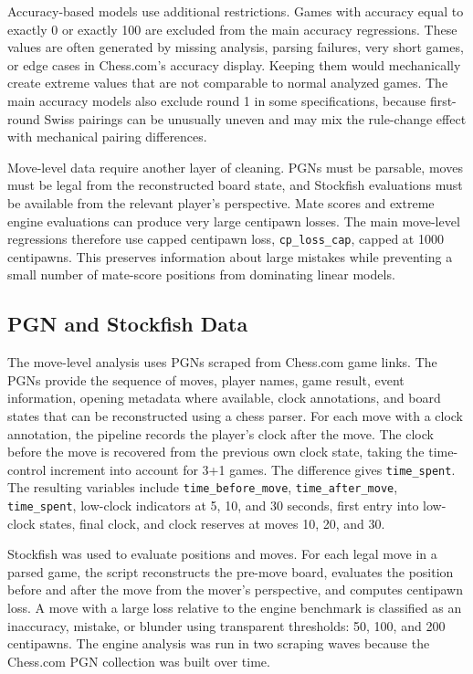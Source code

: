 Accuracy-based models use additional restrictions. Games with accuracy equal to exactly 0 or exactly 100 are excluded from the main accuracy regressions. These values are often generated by missing analysis, parsing failures, very short games, or edge cases in Chess.com's accuracy display. Keeping them would mechanically create extreme values that are not comparable to normal analyzed games. The main accuracy models also exclude round 1 in some specifications, because first-round Swiss pairings can be unusually uneven and may mix the rule-change effect with mechanical pairing differences.

Move-level data require another layer of cleaning. PGNs must be parsable, moves must be legal from the reconstructed board state, and Stockfish evaluations must be available from the relevant player's perspective. Mate scores and extreme engine evaluations can produce very large centipawn losses. The main move-level regressions therefore use capped centipawn loss, \texttt{cp\_loss\_cap}, capped at 1000 centipawns. This preserves information about large mistakes while preventing a small number of mate-score positions from dominating linear models.

\subsection{PGN and Stockfish Data}

The move-level analysis uses PGNs scraped from Chess.com game links. The PGNs provide the sequence of moves, player names, game result, event information, opening metadata where available, clock annotations, and board states that can be reconstructed using a chess parser. For each move with a clock annotation, the pipeline records the player's clock after the move. The clock before the move is recovered from the previous own clock state, taking the time-control increment into account for 3+1 games. The difference gives \texttt{time\_spent}. The resulting variables include \texttt{time\_before\_move}, \texttt{time\_after\_move}, \texttt{time\_spent}, low-clock indicators at 5, 10, and 30 seconds, first entry into low-clock states, final clock, and clock reserves at moves 10, 20, and 30.

Stockfish was used to evaluate positions and moves. For each legal move in a parsed game, the script reconstructs the pre-move board, evaluates the position before and after the move from the mover's perspective, and computes centipawn loss. A move with a large loss relative to the engine benchmark is classified as an inaccuracy, mistake, or blunder using transparent thresholds: 50, 100, and 200 centipawns. The engine analysis was run in two scraping waves because the Chess.com PGN collection was built over time. 

